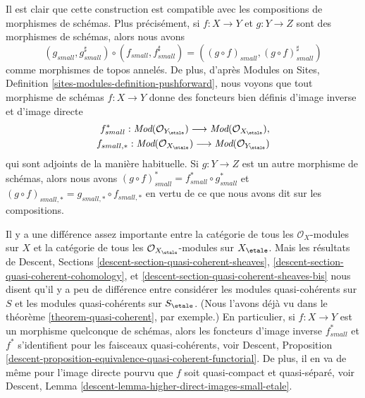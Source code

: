 \medskip\noindent
Il est clair que cette construction est compatible avec les compositions de
morphismes de sch\'emas. Plus pr\'ecis\'ement, si $f : X \to Y$ et $g : Y \to Z$
sont des morphismes de sch\'emas, alors nous avons
$$
(g_{small}, g_{small}^\sharp)
\circ
(f_{small}, f_{small}^\sharp)
=
((g \circ f)_{small}, (g \circ f)_{small}^\sharp)
$$
comme morphismes de topos annel\'es. De plus, d'apr\`es
Modules on Sites, Definition \ref{sites-modules-definition-pushforward},
nous voyons que tout morphisme de sch\'emas $f : X \to Y$
donne des foncteurs bien d\'efinis d'image inverse et d'image directe
\begin{align*}
f_{small}^* :
\textit{Mod}(\mathcal{O}_{Y_\etale})
\longrightarrow
\textit{Mod}(\mathcal{O}_{X_\etale}), \\
f_{small, *} :
\textit{Mod}(\mathcal{O}_{X_\etale})
\longrightarrow
\textit{Mod}(\mathcal{O}_{Y_\etale})
\end{align*}
qui sont adjoints de la mani\`ere habituelle. Si $g : Y \to Z$ est un autre morphisme
de sch\'emas, alors nous avons
$(g \circ f)_{small}^* = f_{small}^* \circ g_{small}^*$
et $(g \circ f)_{small, *} = g_{small, *} \circ f_{small, *}$
en vertu de ce que nous avons dit sur les compositions.

\medskip\noindent
Il y a une diff\'erence assez importante entre la cat\'egorie
de tous les $\mathcal{O}_X$-modules sur $X$ et la cat\'egorie de tous les
$\mathcal{O}_{X_\etale}$-modules sur $X_\etale$. Mais les
r\'esultats de
Descent, Sections \ref{descent-section-quasi-coherent-sheaves},
\ref{descent-section-quasi-coherent-cohomology}, et
\ref{descent-section-quasi-coherent-sheaves-bis}
nous disent qu'il y a peu de diff\'erence entre consid\'erer les modules quasi-coh\'erents
sur $S$ et les modules quasi-coh\'erents sur $S_\etale$.
(Nous l'avons d\'ej\`a vu dans le
th\'eor\`eme \ref{theorem-quasi-coherent},
par exemple.)
En particulier, si $f : X \to Y$ est un morphisme quelconque de sch\'emas, alors
les foncteurs d'image inverse $f_{small}^*$ et $f^*$ s'identifient pour les
faisceaux quasi-coh\'erents, voir
Descent,
Proposition \ref{descent-proposition-equivalence-quasi-coherent-functorial}.
De plus, il en va de m\^eme pour l'image directe pourvu que $f$ soit
quasi-compact et quasi-s\'epar\'e, voir
Descent, Lemma \ref{descent-lemma-higher-direct-images-small-etale}.

